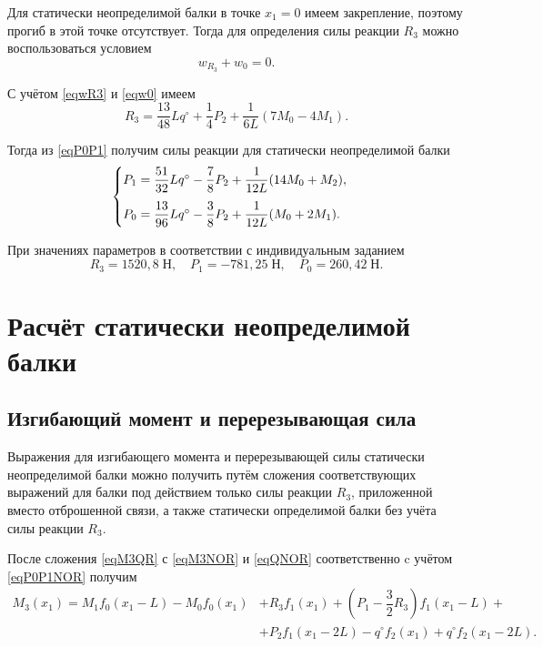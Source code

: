 \documentclass[12pt, a4paper]{article}
\begin{document}
	Для статически неопределимой балки в точке $x_1 = 0$ имеем закрепление, поэтому  прогиб в этой точке отсутствует. Тогда для определения силы реакции $R_3$ можно воспользоваться условием 
	\[
	w_{R_3} + w_0 = 0.
	\]
	
	С учётом \eqref{eqwR3} и \eqref{eqw0} имеем
	\begin{equation*}
		R_3 = \dfrac{13}{48} L q^{\circ} + \dfrac{1}{4} P_2 + \dfrac{1}{6L} (7 M_0 - 4 M_1).
	\end{equation*}
	
	Тогда из \eqref{eqP0P1} получим силы реакции для статически неопределимой балки
	\begin{equation*}
		\begin{cases}\vspace{0.75em}
			P_1 = \dfrac{51}{32} L q^{\circ} - \dfrac{7}{8} P_2 + \dfrac{1}{12L} (14 M_0 + M_2), \\
			P_0 = \dfrac{13}{96} L q^{\circ} - \dfrac{3}{8} P_2 + \dfrac{1}{12L} (M_0 + 2 M_1). \\
		\end{cases}
	\end{equation*}
	
	При значениях параметров в соответствии с индивидуальным заданием
	\vspace{-0.5em}
	\[
	R_3 = 1520{,}8 \; \text{Н}, \quad P_1 = -781{,}25 \; \text{Н}, \quad P_0 = 260{,}42 \; \text{Н}.
	\]
	
	\vspace{-1.5em}
	
	\section{Расчёт статически неопределимой балки}
	\subsection{Изгибающий момент и перерезывающая сила}
	
	Выражения для изгибающего момента и перерезывающей силы статически неопределимой балки можно получить путём сложения соответствующих выражений для балки под действием только силы реакции $R_3$, приложенной вместо отброшенной связи, а также статически определимой балки без учёта силы реакции $R_3$. 
	
	После сложения \eqref{eqM3QR} с \eqref{eqM3NOR} и \eqref{eqQNOR} соответственно c учётом \eqref{eqP0P1NOR} получим
	\vspace{-0.25em}
	\begin{equation*}
		\begin{split}
			M_3(x_1) = M_1 f_0(x_1 - L) - M_0 f_0(x_1) & + R_3 f_1(x_1) + \left( P_1 - \dfrac{3}{2} R_3 \right) f_1(x_1 - L) + \\ & + P_2 f_1(x_1 - 2L) - q^{\circ} f_2(x_1) + q^{\circ} f_2(x_1 - 2L).
		\end{split}
	\end{equation*}
	
\end{document}
